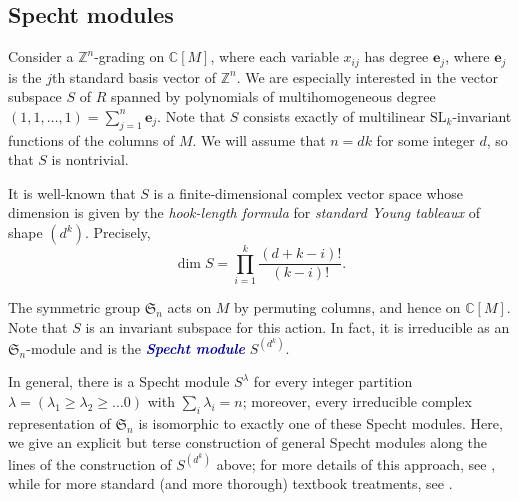 \documentclass[10pt]{amsart}
\theoremstyle{definition}
\theoremstyle{plain}
\theoremstyle{plain}
\theoremstyle{definition}
\theoremstyle{remark}
\theoremstyle{plain}
\theoremstyle{plain}
\theoremstyle{plain}
\numberwithin{equation}{section}
\newcommand{\Z}{\mathbb Z}
\newcommand{\C}{\mathbb C}
\newcommand{\SL}{\mathrm{SL}}
\newcommand{\newword}[1]{\textcolor{darkblue}{\textbf{\emph{#1}}}}
\begin{document}
\subsection{Specht modules}
\label{sec:Spechtbackground}

Consider a $\Z^n$-grading on $\C[M]$, where each variable $x_{ij}$ has degree $\mathbf{e}_j$, where $\mathbf{e}_j$ is the $j$th standard basis vector of $\Z^n$. We are especially interested in the vector subspace $S$ of $R$ spanned by polynomials of multihomogeneous degree $(1,1, \dots, 1) = \sum_{j = 1}^n \mathbf{e}_j$. Note that $S$ consists exactly of multilinear $\SL_k$-invariant functions of the columns of $M$. We will assume that $n = dk$ for some integer $d$, so that $S$ is nontrivial.

It is well-known that $S$ is a finite-dimensional complex vector space whose dimension is given by the \emph{hook-length formula} for \emph{standard Young tableaux} of shape $(d^k)$. Precisely, 
\[
\dim S = \prod_{i=1}^{k} \frac{(d+k-i)!}{(k-i)!}.
\]

The symmetric group $\mathfrak{S}_n$ acts on $M$ by permuting columns, and hence on $\C[M]$. Note that $S$ is an invariant subspace for this action. In fact, it is irreducible as an $\mathfrak{S}_n$-module and is the \newword{Specht module} $S^{(d^k)}$.

In general, there is a Specht module $S^\lambda$ for every integer partition $\lambda = (\lambda_1 \geq \lambda_2 \geq \dots 0)$ with $\sum_i \lambda_i = n$; moreover, every irreducible complex representation of $\mathfrak{S}_n$ is isomorphic to exactly one of these Specht modules. Here, we give an explicit but terse construction of general Specht modules along the lines of the construction of $S^{(d^k)}$ above; for more details of this approach, see \cite[\S2.3]{Patrias.Pechenik.Striker}, while for more standard (and more thorough) textbook treatments, see \eg \cite{Fulton.Harris,Fulton:YoungTableaux,Sagan}. 
\end{document}
